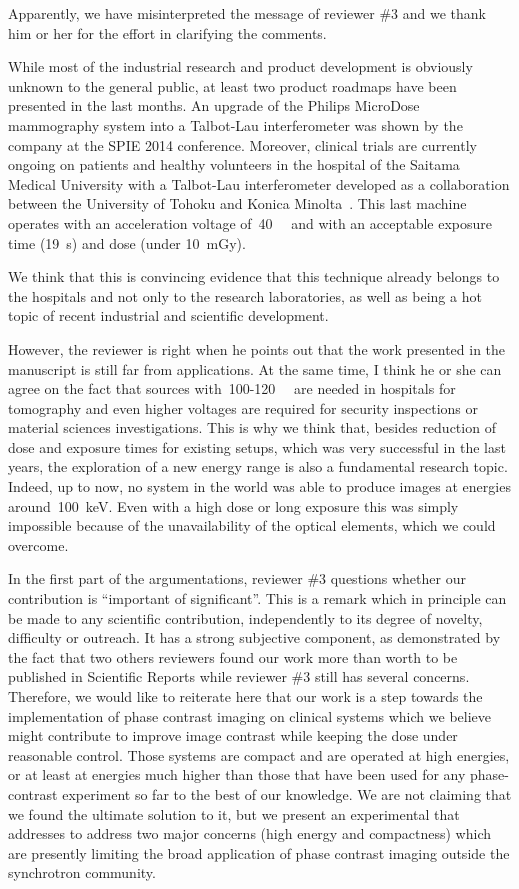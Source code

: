 \documentclass[a4paper,english]{scrartcl}
\begin{document}
Apparently, we have misinterpreted the message of reviewer \#3
and we thank him or her for the effort in clarifying the comments.


While most of the industrial research and product development is obviously
unknown to the general public, at least two product roadmaps have been presented in
the last months. An upgrade of the Philips MicroDose mammography system into a
Talbot-Lau interferometer was shown by the company at the SPIE
2014 conference\cite{Roessl2014,Roessl06032014}. Moreover, clinical trials are currently
ongoing on patients and healthy volunteers in the hospital of the Saitama
Medical University with a Talbot-Lau interferometer
developed as a collaboration between the University of Tohoku and Konica
Minolta~\cite{Momose06032014}. This last machine operates with an
acceleration voltage of~\SI{40}{\kilo\voltpeak} and with an acceptable
exposure time (\SI{19}{\second}) and dose (under \SI{10}{\milli\gray}).

We think that this is convincing evidence that this technique already belongs to the
hospitals and not only to the research laboratories, as well as being a hot
topic of recent industrial and scientific development.

However, the reviewer is right when he points out that the work presented in
the manuscript is still far from applications. At the same time, I think he
or she can agree on the fact that sources
with~\num{100}-\SI{120}{\kilo\voltpeak} are needed in
hospitals for tomography and even higher voltages are required for security
inspections or material sciences investigations.
This is why we think that, besides reduction of dose and exposure times for
existing setups, which was very successful in the last years, the
exploration of a new energy range is also a fundamental
research topic. Indeed, up to now, no system in the world was able to
produce images at energies around~\SI{100}{\kilo\eV}. Even with a high
dose or long exposure
this was simply impossible because of the unavailability of the optical
elements, which we could overcome.

In the first part of the argumentations, reviewer \#3 questions whether our
contribution is ``important of significant''. This is a remark which in
principle can be made to any scientific contribution, independently to its
degree of novelty, difficulty or outreach. It has a strong subjective
component, as demonstrated by the fact that two others reviewers found our
work more than worth to be published in Scientific Reports while reviewer \#3 still has
several concerns. Therefore, we would like to reiterate here that our work
is a step towards the implementation of phase contrast imaging on clinical
systems which we believe might contribute to improve image contrast while
keeping the dose under reasonable control. Those systems are compact and are
operated at high energies, or at least at energies much higher than those
that have been used for any phase-contrast experiment so far to the best of
our knowledge. We are not claiming that we found the ultimate solution to
it, but we present an experimental that addresses to address two major concerns
(high energy and compactness) which are presently limiting the broad
application of phase contrast imaging outside the synchrotron community.
\end{document}
